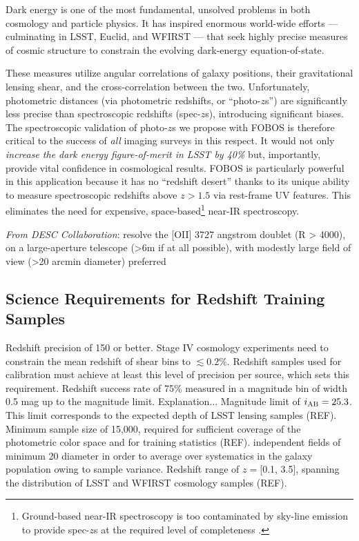 \documentclass[11pt,a4paper,twoside,onecolumn,openany,final,oldfontcommands]{memoir}
\begin{document}
Dark energy is one of the most fundamental, unsolved problems in both cosmology and particle physics.  It has inspired enormous world-wide efforts --- culminating in LSST, Euclid, and WFIRST --- that seek highly precise measures of cosmic structure to constrain the evolving dark-energy equation-of-state.

These measures utilize angular correlations of galaxy positions, their gravitational lensing shear, and the cross-correlation between the two. Unfortunately, photometric distances (via photometric redshifts, or ``photo-$z$s'') are significantly less precise than spectroscopic redshifts (spec-$z$s), introducing significant biases.  The spectroscopic validation of photo-$z$s we propose with FOBOS is therefore critical to the success of {\it all} imaging surveys in this respect. It would not only \emph{increase the dark energy figure-of-merit in LSST by 40\%} \citep{newman15} but, importantly, provide vital confidence in cosmological results.  FOBOS is particularly powerful in this application because it has no ``redshift desert'' thanks to its unique ability to measure spectroscopic redshifts above $z > 1.5$ via rest-frame UV features.  This eliminates the need for expensive, space-based\footnote{Ground-based near-IR spectroscopy is too contaminated by sky-line emission to provide spec-$z$s at the required level of completeness \citep{newman15}.} near-IR spectroscopy. 

\emph{From DESC Collaboration}: resolve the [OII] 3727 angstrom doublet (R > 4000), on a large-aperture telescope (>6m if at all possible), with modestly large field of view (>20 arcmin diameter) preferred

\subsection{Science Requirements for Redshift Training Samples}

\begin{sciencerequirement}
\reqitem Redshift precision of 150 \kms{} or better. Stage IV cosmology experiments need to constrain the mean redshift of shear bins to $\lesssim0.2\%$. Redshift samples used for calibration must achieve at least this level of precision per source, which sets this requirement. 
%
\reqitem Redshift success rate of 75\% measured in a magnitude bin of width 0.5 mag up to the magnitude limit.  Explanation...
%
\reqitem Magnitude limit of $i_{\rm AB} = 25.3$.  This limit corresponds to the expected depth of LSST lensing samples (REF).
%
\reqitem Minimum sample size of 15,000, required for sufficient coverage of the photometric color space and for training statistics (REF).
%
 independent fields of minimum 20\arcmin{} diameter in order to average over systematics in the galaxy population owing to sample variance.
%
\reqitem Redshift range of $z = $[0.1, 3.5], spanning the distribution of LSST and WFIRST cosmology samples (REF).
%
\end{sciencerequirement}
\end{document}
